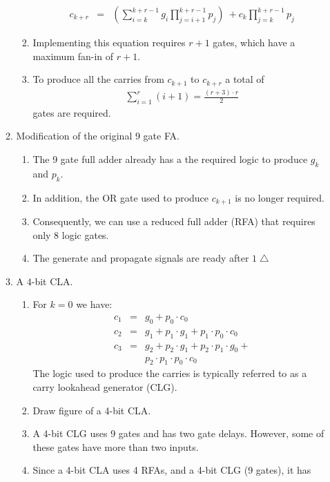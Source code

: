 \documentclass[times, twocolumn, 10pt]{article}
\begin{document}
\begin{enumerate}
\begin{enumerate}
\begin{enumerate}
      \begin{eqnarray*}
	c_{k+r} & = & \left(\sum_{i=k}^{k+r-1} g_{i}
	\prod_{j=i+1}^{k+r-1}p_{j}\right) \
	+ c_{k} \prod_{j=k}^{k+r-1}p_{j} 
      \end{eqnarray*}
    \item Implementing this equation requires $r+1$ gates, which
      have a maximum 
      fan-in of $r+1$. 
    \item To produce all the carries from $c_{k+1}$ to $c_{k+r}$ a total of 
      \begin{eqnarray*}
	\sum_{i=1}^{r} (i + 1) = \frac{(r + 3) \cdot r}{2}
      \end{eqnarray*}
      gates are required.
    \end{enumerate}
  \item Modification of the original 9 gate FA. 
    \begin{enumerate}
    \item The 9 gate full adder already has a the required logic
      to produce $g_{k}$ and $p_{k}$. 
    \item In addition, the OR gate used to produce $c_{k+1}$ is no
      longer required. 
    \item Consequently, we can use a reduced full adder (RFA) that
      requires only 8 logic gates. 
    \item The generate and propagate signals are ready after 
      $1 \bigtriangleup$
    \end{enumerate}
  \item A $4$-bit CLA. 
    \begin{enumerate}
    \item For $k=0$ we have:
      \begin{eqnarray*}
	c_{1} & = & g_{0} + p_{0} \cdot c_{0} \\
	c_{2} & = & g_{1} + p_{1} \cdot g_{1} + p_{1} \cdot p_{0}
	\cdot c_{0} \\
	c_{3} & = & g_{2} + p_{2} \cdot g_{1} + p_{2} \cdot p_{1}
	\cdot g_{0} + \\
        & & p_{2} \cdot p_{1} \cdot p_{0} \cdot c_{0} 
      \end{eqnarray*}
      The logic used to produce the carries is typically
      referred to as a carry lookahead generator (CLG). 
    \item Draw figure of a 4-bit CLA. 
    \item A 4-bit CLG uses 9 gates and has two gate delays. 
      However, some of these gates have more than two inputs.
    \item Since a 4-bit CLA uses 4 RFAs, and a 4-bit CLG (9 gates), it has 

\end{enumerate}
\end{enumerate}
\end{enumerate}
\end{document}

